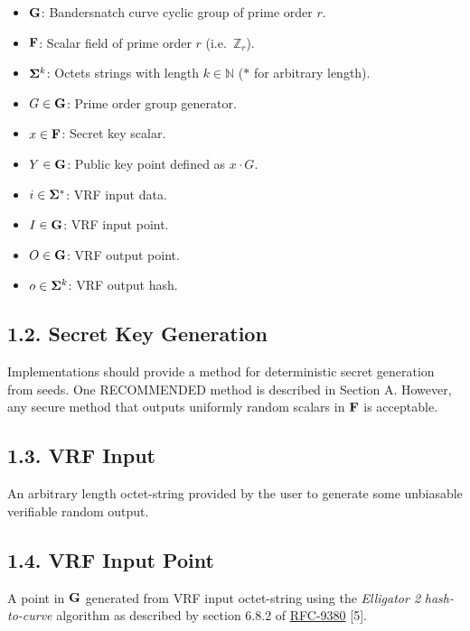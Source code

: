 \documentclass[
]{article}
\begin{document}
\begin{itemize}
\item
  \(\bold{G}\): Bandersnatch curve cyclic group of prime order \(r\).
\item
  \(\bold{F}\): Scalar field of prime order \(r\)
  (i.e.~\(\mathbb{Z}_r\)).
\item
  \(\bold{\Sigma}^k\): Octets strings with length \(k \in \mathbb{N}\)
  (\(*\) for arbitrary length).
\item
  \(G \in \bold{G}\): Prime order group generator.
\item
  \(x \in \bold{F}\): Secret key scalar.
\item
  \(Y \in \bold{G}\): Public key point defined as \(x \cdot G\).
\item
  \(i \in \bold{\Sigma}^*\): VRF input data.
\item
  \(I \in \bold{G}\): VRF input point.
\item
  \(O \in \bold{G}\): VRF output point.
\item
  \(o \in \bold{\Sigma}^k\): VRF output hash.
\end{itemize}

\subsection{1.2. Secret Key Generation}\label{secret-key-generation}

Implementations should provide a method for deterministic secret
generation from seeds. One RECOMMENDED method is described in Section A.
However, any secure method that outputs uniformly random scalars in
\(\bold{F}\)\hspace{0pt} is acceptable.

\subsection{1.3. VRF Input}\label{vrf-input}

An arbitrary length octet-string provided by the user to generate some
unbiasable verifiable random output.

\subsection{1.4. VRF Input Point}\label{vrf-input-point}

A point in \(\bold{G}\) generated from VRF input octet-string using the
\emph{Elligator 2} \emph{hash-to-curve} algorithm as described by
section 6.8.2 of
\href{https://datatracker.ietf.org/doc/rfc9380}{RFC-9380} {[}5{]}.
\end{document}
